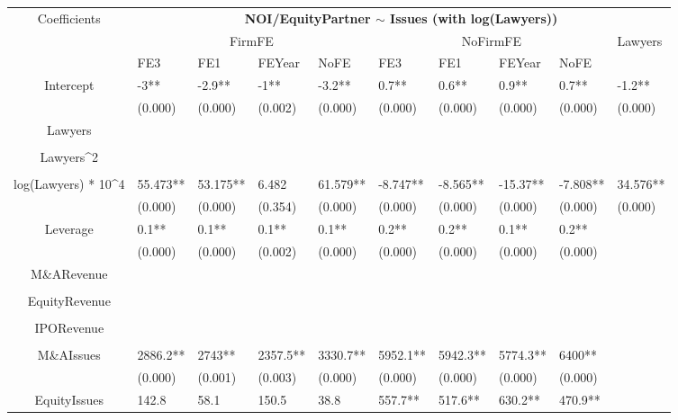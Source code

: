 \documentclass{article}
\begin{document}
\begin{table}[H]
\centering
\begin{tabular}{|clllllllll|}
\hline
\multirow{3}{*}{Coefficients} & \multicolumn{9}{c|}{\textbf{NOI/EquityPartner $\sim$ Issues (with log(Lawyers))}} \\
\cline{2-10}
& \multicolumn{4}{c}{FirmFE} & \multicolumn{4}{c}{NoFirmFE} & \multirow{2}{*}{Lawyers} \\
\cline{2-9}
& FE3 & FE1 & FEYear & NoFE & FE3 & FE1 & FEYear & NoFE &  \\
\hline
 
Intercept & -3** & -2.9** & -1** & -3.2** & 0.7** & 0.6** & 0.9** & 0.7** & -1.2** \\ 
   & (0.000) & (0.000) & (0.002) & (0.000) & (0.000) & (0.000) & (0.000) & (0.000) & (0.000) \\ 
  Lawyers &  &  &  &  &  &  &  &  &  \\ 
   &  &  &  &  &  &  &  &  &  \\ 
  Lawyers^2 &  &  &  &  &  &  &  &  &  \\ 
   &  &  &  &  &  &  &  &  &  \\ 
  log(Lawyers) * 10^4 & 55.473** & 53.175** & 6.482 & 61.579** & -8.747** & -8.565** & -15.37** & -7.808** & 34.576** \\ 
   & (0.000) & (0.000) & (0.354) & (0.000) & (0.000) & (0.000) & (0.000) & (0.000) & (0.000) \\ 
  Leverage & 0.1** & 0.1** & 0.1** & 0.1** & 0.2** & 0.2** & 0.1** & 0.2** &  \\ 
   & (0.000) & (0.000) & (0.002) & (0.000) & (0.000) & (0.000) & (0.000) & (0.000) &  \\ 
  M\&ARevenue &  &  &  &  &  &  &  &  &  \\ 
   &  &  &  &  &  &  &  &  &  \\ 
  EquityRevenue &  &  &  &  &  &  &  &  &  \\ 
   &  &  &  &  &  &  &  &  &  \\ 
  IPORevenue &  &  &  &  &  &  &  &  &  \\ 
   &  &  &  &  &  &  &  &  &  \\ 
  M\&AIssues & 2886.2** & 2743** & 2357.5** & 3330.7** & 5952.1** & 5942.3** & 5774.3** & 6400** &  \\ 
   & (0.000) & (0.001) & (0.003) & (0.000) & (0.000) & (0.000) & (0.000) & (0.000) &  \\ 
  EquityIssues & 142.8 & 58.1 & 150.5 & 38.8 & 557.7** & 517.6** & 630.2** & 470.9** &  \\ 

\end{tabular}
\end{table}
\end{document}
